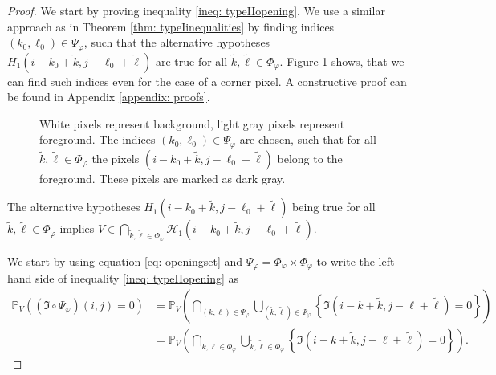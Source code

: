 \documentclass[a4paper,12pt]{article}
\theoremstyle{plain}
\theoremstyle{definition}
\begin{document}
\begin{proof}
	We start by proving inequality \eqref{ineq: typeIIopening}. We use a similar approach as in Theorem \ref{thm: typeIinequalities} by finding indices $(k_0, \ell_0) \in \Psi_\varphi$, such that the alternative hypotheses $H_1(i - k_0 + \tilde{k}, j - \ell_0 + \tilde{\ell})$ are true for all $\tilde{k}, \tilde{\ell} \in \Phi_\varphi$. Figure \ref{fig: setofforegroundpixels} shows, that we can find such indices even for the case of a corner pixel. A constructive proof can be found in Appendix \ref{appendix: proofs}.
	
	\begin{figure}[h]
		\centering
		\caption{White pixels represent background, light gray pixels represent foreground. The indices $(k_0, \ell_0) \in \Psi_\varphi$ are chosen, such that for all $\tilde{k}, \tilde{\ell} \in \Phi_\varphi$ the pixels $(i - k_0 + \tilde{k}, j - \ell_0 + \tilde{\ell})$ belong to the foreground. These pixels are marked as dark gray.}
		\label{fig: setofforegroundpixels}
	\end{figure}
	
	The alternative hypotheses $H_1(i - k_0 + \tilde{k}, j - \ell_0 + \tilde{\ell})$ being true for all $\tilde{k}, \tilde{\ell} \in \Phi_\varphi$ implies $V \in \bigcap_{\tilde{k}, \tilde{\ell} \in \Phi_\varphi} \mathcal{H}_1(i - k_0 + \tilde{k}, j - \ell_0 + \tilde{\ell})$.
	
	We start by using equation \eqref{eq: openingset} and $\Psi_\varphi = \Phi_\varphi \times \Phi_\varphi$ to write the left hand side of inequality \eqref{ineq: typeIIopening} as
	\begin{align*}
		\mathbb{P}_V\left( (\mathfrak{I} \circ \Psi_\varphi)(i, j) = 0 \right) &= \mathbb{P}_V\left( \bigcap_{(k, \ell) \in \Psi_\varphi} \bigcup_{(\tilde{k}, \tilde{\ell}) \in \Psi_\varphi} \left\{ \mathfrak{I}(i - k + \tilde{k}, j - \ell + \tilde{\ell}) = 0 \right\} \right) \\
		&= \mathbb{P}_V\left( \bigcap_{k, \ell \in \Phi_\varphi} \bigcup_{\tilde{k}, \tilde{\ell} \in \Phi_\varphi} \left\{ \mathfrak{I}(i - k + \tilde{k}, j - \ell + \tilde{\ell}) = 0 \right\} \right).
	\end{align*}
	

\end{proof}
\end{document}
